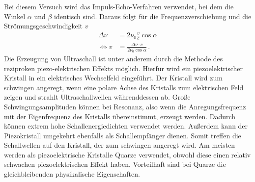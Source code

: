 Bei diesem Versuch wird das Impuls-Echo-Verfahren verwendet, bei dem die Winkel $\alpha$ und $\beta$ identisch sind. Daraus folgt für die
Frequenzverschiebung und die Strömungsgeschwindigkeit $v$
\begin{align}
    \Delta \nu &= 2 \nu_0 \frac{v}{c}\cos \alpha \label{eqn:Frequenzverschiebung_identisch} \\
    \Leftrightarrow v &= \frac{\Delta \nu \cdot c}{2 \nu_0 \cos \alpha } \, . \label{eqn:Stroemungsgeschwindigkeit} 
\end{align}
Die Erzeugung von Ultraschall ist unter anderem durch die Methode des reziproken piezo-elektrischen Effekts möglich. Hierfür wird ein piezoelektrischer Kristall in ein 
elektrisches Wechselfeld eingeführt. Der Kristall wird zum schwingen angeregt, wenn eine polare Achse des Kristalls zum elektrischen Feld zeigen und strahlt Ultraschallwellen währenddessen ab. 
Große Schwingungsamplituden können bei Resonanz, also wenn die Anregungsfrequenz mit der Eigenfrequenz des Kristalls übereinstimmt, erzeugt werden. Dadurch können extrem hohe Schallenergiedichten 
verwendet werden. Außerdem kann der Piezokristall umgekehrt ebenfalls als Schallempfänger dienen. Somit treffen die Schallwellen auf den Kristall, der zum schwingen angeregt wird. Am meisten werden 
als piezoelektrische Kristalle Quarze verwendet, obwohl diese einen relativ schwachen piezoelektrischen Effekt haben. Vorteilhaft sind bei Quarze die gleichbleibenden physikalische Eigenschaften. 

